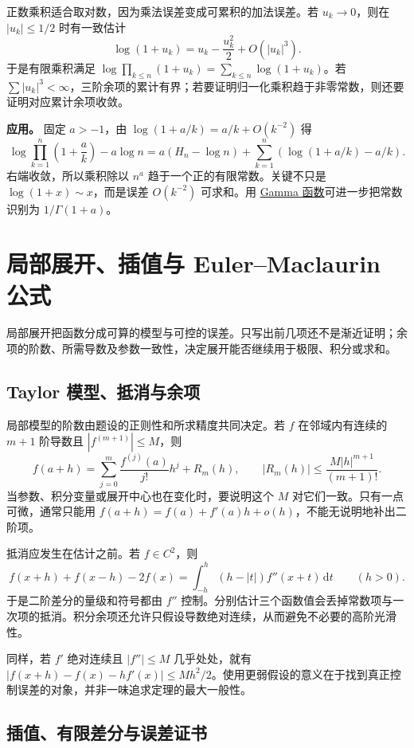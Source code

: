 \documentclass[12pt,fontset=fandol]{ctexart}
\begin{document}
\label{app:limit-products}

正数乘积适合取对数，因为乘法误差变成可累积的加法误差。若 $u_k\to0$，则在 $|u_k|\leq1/2$ 时有一致估计
\[
\log(1+u_k)=u_k-\frac{u_k^2}{2}+O(|u_k|^3).
\]
于是有限乘积满足 $\log\prod_{k\leq n}(1+u_k)=\sum_{k\leq n}\log(1+u_k)$。若 $\sum|u_k|^3<\infty$，三阶余项的累计有界；若要证明归一化乘积趋于非零常数，则还要证明对应累计余项收敛。

\textbf{应用。} 固定 $a>-1$，由 $\log(1+a/k)=a/k+O(k^{-2})$ 得
\[
\log\prod_{k=1}^n\left(1+\frac ak\right)-a\log n
=a(H_n-\log n)+\sum_{k=1}^n\left(\log(1+a/k)-a/k\right).
\]
右端收敛，所以乘积除以 $n^a$ 趋于一个正的有限常数。关键不只是 $\log(1+x)\sim x$，而是误差 $O(k^{-2})$ 可求和。用 \hyperref[app:special-gamma]{Gamma 函数}可进一步把常数识别为 $1/\Gamma(1+a)$。



\section{局部展开、插值与 Euler–Maclaurin 公式}

局部展开把函数分成可算的模型与可控的误差。只写出前几项还不是渐近证明；余项的阶数、所需导数及参数一致性，决定展开能否继续用于极限、积分或求和。

\subsection{Taylor 模型、抵消与余项}

\label{app:estimate-taylor}

局部模型的阶数由题设的正则性和所求精度共同决定。若 $f$ 在邻域内有连续的 $m+1$ 阶导数且 $|f^{(m+1)}|\leq M$，则
\[
f(a+h)=\sum_{j=0}^m\frac{f^{(j)}(a)}{j!}h^j+R_m(h),
\qquad |R_m(h)|\leq\frac{M|h|^{m+1}}{(m+1)!}.
\]
当参数、积分变量或展开中心也在变化时，要说明这个 $M$ 对它们一致。只有一点可微，通常只能用 $f(a+h)=f(a)+f'(a)h+o(h)$，不能无说明地补出二阶项。

抵消应发生在估计之前。若 $f\in C^2$，则
\[
f(x+h)+f(x-h)-2f(x)
=\int_{-h}^{h}(h-|t|)f''(x+t)\,\mathrm dt\qquad(h>0).
\]
于是二阶差分的量级和符号都由 $f''$ 控制。分别估计三个函数值会丢掉常数项与一次项的抵消。积分余项还允许只假设导数绝对连续，从而避免不必要的高阶光滑性。

同样，若 $f'$ 绝对连续且 $|f''|\leq M$ 几乎处处，就有 $|f(x+h)-f(x)-hf'(x)|\leq Mh^2/2$。使用更弱假设的意义在于找到真正控制误差的对象，并非一味追求定理的最大一般性。

\subsection{插值、有限差分与误差证书}
\end{document}
